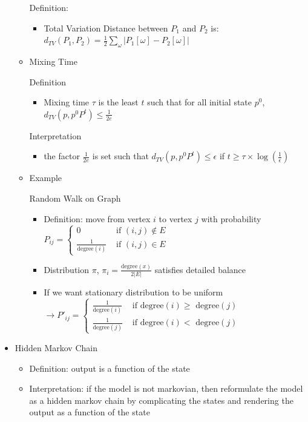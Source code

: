 \documentclass[a4paper]{article}
\begin{document}
\begin{itemize}
\begin{itemize}
                Definition:
                \begin{itemize}
                    \item Total Variation Distance between $P_1$ and $P_2$ is: $d_{\mathit{TV}}(P_1, P_2) = \frac{1}{2} \sum_{\omega} |P_1[\omega] - P_2[\omega]|$
                \end{itemize}
            \item Mixing Time

                Definition
                \begin{itemize}
                    \item Mixing time $\tau$ is the least $t$ such that for all initial state $p^0$, $d_\mathit{TV}(p, p^0P^t) \leq \frac{1}{2e}$
                \end{itemize}
                Interpretation
                \begin{itemize}
                    \item the factor $\frac{1}{2e}$ is set such that $d_\mathit{TV}(p, p^0P^t) \leq \epsilon$ if $t \geq \tau \times \log(\frac{1}{\epsilon})$
                \end{itemize}
            \item Example

                Random Walk on Graph
                \begin{itemize}
                    \item Definition: move from vertex $i$ to vertex $j$ with probability $P_{ij} = \left\{ \begin{array}{cc} 0 & \text{ if $(i, j) \not \in E$ } \\ \frac{1}{\text{degree}(i)} & \text{ if $(i, j) \in E$ } \end{array} \right.$
                    \item Distribution $\pi$, $\pi_i = \frac{\text{degree}(x)}{2 |E|}$ satisfies detailed balance
                    \item If we want stationary distribution to be uniform $\rightarrow P'_{ij} = \left\{ \begin{array}{cc} \frac{1}{\text{degree}(i)} & \text{ if degree$(i) \geq$ degree$(j)$ } \\ \frac{1}{\text{degree}(j)} & \text{ if degree$(i) < $ degree$(j)$ } \end{array} \right.$
                \end{itemize}
        \end{itemize}
    \item Hidden Markov Chain
        \begin{itemize}
            \item Definition: output is a function of the state
            \item Interpretation: if the model is not markovian, then reformulate the model as a hidden markov chain by complicating the states and rendering the output as a function of the state
        \end{itemize}
\end{itemize}
\end{document}
